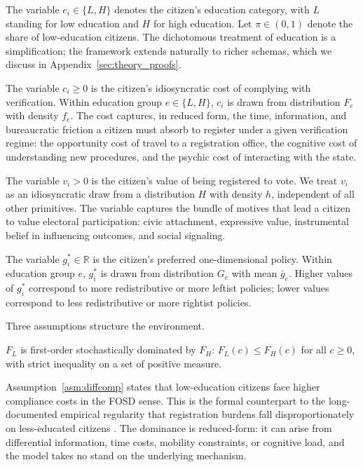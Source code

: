 The variable $e_i \in \{L, H\}$ denotes the citizen's education category, with $L$ standing for low education and $H$ for high education. Let $\pi \in (0, 1)$ denote the share of low-education citizens. The dichotomous treatment of education is a simplification; the framework extends naturally to richer schemas, which we discuss in Appendix~\ref{sec:theory_proofs}.

The variable $c_i \geq 0$ is the citizen's idiosyncratic cost of complying with verification. Within education group $e \in \{L, H\}$, $c_i$ is drawn from distribution $F_e$ with density $f_e$. The cost captures, in reduced form, the time, information, and bureaucratic friction a citizen must absorb to register under a given verification regime: the opportunity cost of travel to a registration office, the cognitive cost of understanding new procedures, and the psychic cost of interacting with the state.

The variable $v_i > 0$ is the citizen's value of being registered to vote. We treat $v_i$ as an idiosyncratic draw from a distribution $H$ with density $h$, independent of all other primitives. The variable captures the bundle of motives that lead a citizen to value electoral participation: civic attachment, expressive value, instrumental belief in influencing outcomes, and social signaling.

The variable $g_i^* \in \mathbb{R}$ is the citizen's preferred one-dimensional policy. Within education group $e$, $g_i^*$ is drawn from distribution $G_e$ with mean $\bar g_e$. Higher values of $g_i^*$ correspond to more redistributive or more leftist policies; lower values correspond to less redistributive or more rightist policies.

Three assumptions structure the environment.

\begin{assumption}
\label{asm:diffcomp}
$F_L$ is first-order stochastically dominated by $F_H$: $F_L(c) \leq F_H(c)$ for all $c \geq 0$, with strict inequality on a set of positive measure.
\end{assumption}

Assumption~\ref{asm:diffcomp} states that low-education citizens face higher compliance costs in the FOSD sense. This is the formal counterpart to the long-documented empirical regularity that registration burdens fall disproportionately on less-educated citizens \citep{Rosenstone1978TheEffectRegistra, Nagler1991TheEffectRegistra, Ansolabehere2005TheIntroducVoter, Hajnal2017VoterIdentifiLaws}. The dominance is reduced-form: it can arise from differential information, time costs, mobility constraints, or cognitive load, and the model takes no stand on the underlying mechanism.

